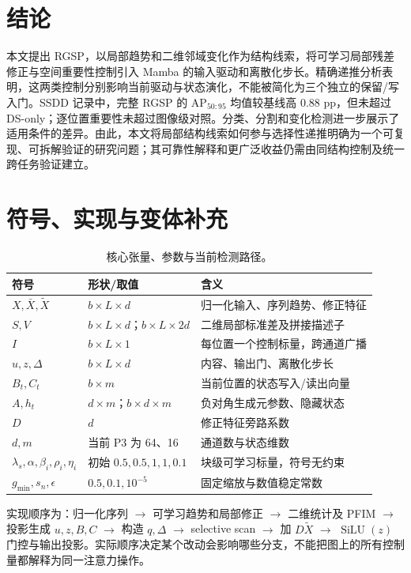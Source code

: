 \documentclass[UTF8,11pt,a4paper,fontset=fandol]{ctexart}
\newcommand{\ap}{\mathrm{AP}}
\newcommand{\SiLU}{\operatorname{SiLU}}
\begin{document}
\section{结论}
本文提出 RGSP，以局部趋势和二维邻域变化作为结构线索，将可学习局部残差修正与空间重要性控制引入 Mamba 的输入驱动和离散化步长。精确递推分析表明，这两类控制分别影响当前驱动与状态演化，不能被简化为三个独立的保留/写入门。SSDD 记录中，完整 RGSP 的 $\ap_{50:95}$ 均值较基线高 0.88 pp，但未超过 DS-only；逐位置重要性未超过图像级对照。分类、分割和变化检测进一步展示了适用条件的差异。由此，本文将局部结构线索如何参与选择性递推明确为一个可复现、可拆解验证的研究问题；其可靠性解释和更广泛收益仍需由同结构控制及统一跨任务验证建立。
\FloatBarrier
\appendix
\section{符号、实现与变体补充}\label{app:implementation}
\begin{table}[H]\centering\small
\caption{核心张量、参数与当前检测路径。}
\begin{tabularx}{\linewidth}{P{2.7cm}P{3.5cm}Y}
\toprule
符号 & 形状/取值 & 含义\\
\midrule
$X,\bar X,\widetilde X$ & $b\times L\times d$ & 归一化输入、序列趋势、修正特征\\
$S,V$ & $b\times L\times d$；$b\times L\times2d$ & 二维局部标准差及拼接描述子\\
$I$ & $b\times L\times1$ & 每位置一个控制标量，跨通道广播\\
$u,z,\Delta$ & $b\times L\times d$ & 内容、输出门、离散化步长\\
$B_t,C_t$ & $b\times m$ & 当前位置的状态写入/读出向量\\
$A,h_t$ & $d\times m$；$b\times d\times m$ & 负对角生成元参数、隐藏状态\\
$D$ & $d$ & 修正特征旁路系数\\
$d,m$ & 当前 P3 为 64、16 & 通道数与状态维数\\
$\lambda_s,\alpha,\beta_i,\rho_i,\eta_i$ & 初始 $0.5,0.5,1,1,0.1$ & 块级可学习标量，符号无约束\\
$g_{\min},s_n,\epsilon$ & $0.5,0.1,10^{-5}$ & 固定缩放与数值稳定常数\\
\bottomrule
\end{tabularx}
\end{table}

实现顺序为：归一化序列 $\rightarrow$ 可学习趋势和局部修正 $\rightarrow$ 二维统计及 PFIM $\rightarrow$ 投影生成 $u,z,B,C$ $\rightarrow$ 构造 $q,\Delta$ $\rightarrow$ selective scan $\rightarrow$ 加 $D\widetilde X$ $\rightarrow$ $\SiLU(z)$ 门控与输出投影。实际顺序决定某个改动会影响哪些分支，不能把图上的所有控制量都解释为同一注意力操作。
\end{document}
